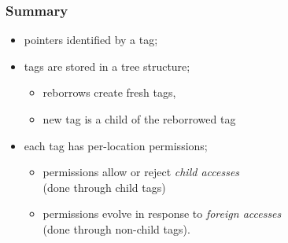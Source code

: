 \begin{frame}
    \frametitle{Summary}
    \begin{itemize}
        \item pointers identified by a tag;
        \item tags are stored in a tree structure;
            \begin{itemize}
                \item reborrows create fresh tags,
                \item new tag is a child of the reborrowed tag
            \end{itemize}
        \item each tag has per-location permissions;
            \begin{itemize}
                \item permissions allow or reject \textit{child accesses}\\
                    (done through child tags)
                \item permissions evolve in response to \textit{foreign accesses}\\
                    (done through non-child tags).
            \end{itemize}
    \end{itemize}
\end{frame}
